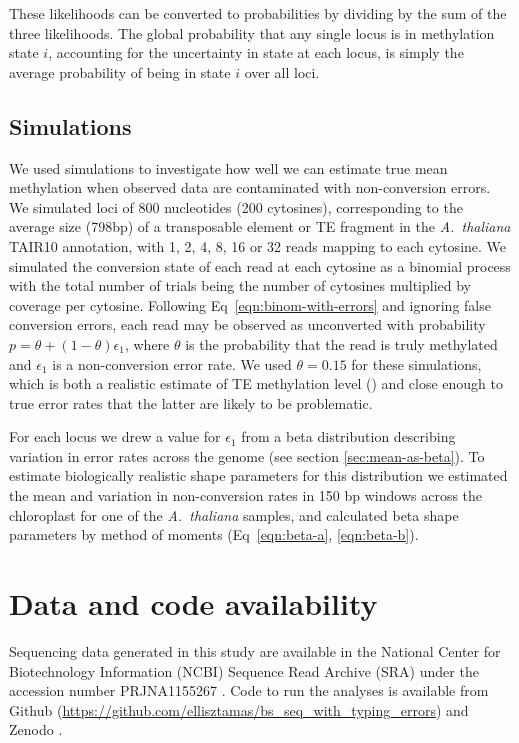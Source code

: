 \documentclass[10pt,letterpaper]{article}
\begin{document}
These likelihoods can be converted to probabilities by dividing by the sum of the three likelihoods.
The global probability that any single locus is in methylation state $i$, accounting for the uncertainty in state at each locus, is simply the average probability of being in state $i$ over all loci.

\subsection*{Simulations}

We used simulations to investigate how well we can estimate true mean methylation when observed data are contaminated with non-conversion errors.
We simulated loci of 800 nucleotides (200 cytosines), corresponding to the average size (798bp) of a transposable element or TE fragment in the \textit{A.~thaliana} TAIR10 annotation, with 1, 2, 4, 8, 16 or 32 reads mapping to each cytosine.
We simulated the conversion state of each read at each cytosine as a binomial process with the total number of trials being the number of cytosines multiplied by coverage per cytosine.
Following Eq~\ref{eqn:binom-with-errors} and ignoring false conversion errors, each read may be observed as unconverted with probability $p=\theta + (1-\theta)\epsilon_1$, where $\theta$ is the probability that the read is truly methylated and $\epsilon_1$ is a non-conversion error rate.
We used $\theta=0.15$ for these simulations, which is both a realistic estimate of TE methylation level (\cite{dubin2015dna}) and close enough to true error rates that the latter are likely to be problematic.

For each locus we drew a value for $\epsilon_1$ from a beta distribution describing variation in error rates across the genome (see section \ref{sec:mean-as-beta}).
To estimate biologically realistic shape parameters for this distribution we estimated the mean and variation in non-conversion rates in 150 bp windows across the chloroplast for one of the \emph{A.~thaliana} samples, and calculated beta shape parameters by method of moments (Eq~\ref{eqn:beta-a}, \ref{eqn:beta-b}).

\section*{Data and code availability}

Sequencing data generated in this study are available in the National Center for Biotechnology Information (NCBI) Sequence Read Archive (SRA) under the accession number PRJNA1155267 \cite{ellis2023datafrom}.
Code to run the analyses is available from Github (\url{https://github.com/ellisztamas/bs_seq_with_typing_errors}) and Zenodo \cite{ellis2023codefrom}.
\end{document}
